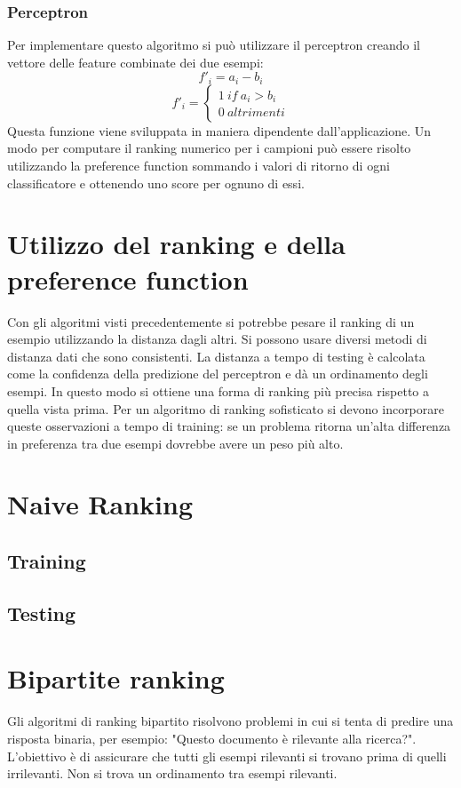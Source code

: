 		\subsubsection{Perceptron}
		Per implementare questo algoritmo si pu\`o utilizzare il perceptron creando il vettore delle feature combinate dei due esempi:
		$$f'_i = a_i -b_i$$
		$$f'_i = \begin{cases}1\ if\ a_i > b_i\\0\ altrimenti\end{cases}$$
		Questa funzione viene sviluppata in maniera dipendente dall'applicazione.
		Un modo per computare il ranking numerico per i campioni pu\`o essere risolto utilizzando la preference function sommando i valori di ritorno di ogni classificatore e ottenendo uno score per ognuno di essi.

\section{Utilizzo del ranking e della preference function}
Con gli algoritmi visti precedentemente si potrebbe pesare il ranking di un esempio utilizzando la distanza dagli altri.
Si possono usare diversi metodi di distanza dati che sono consistenti.
La distanza a tempo di testing \`e calcolata come la confidenza della predizione del perceptron e d\`a un ordinamento degli esempi.
In questo modo si ottiene una forma di ranking pi\`u precisa rispetto a quella vista prima.
Per un algoritmo di ranking sofisticato si devono incorporare queste osservazioni a tempo di training: se un problema ritorna un'alta differenza in preferenza tra due esempi dovrebbe avere un peso pi\`u alto.

\section{Naive Ranking}

	\subsection{Training}
	
	
	\subsection{Testing}
	

\section{Bipartite ranking}
Gli algoritmi di ranking bipartito risolvono problemi in cui si tenta di predire una risposta binaria, per esempio: "Questo documento \`e rilevante alla ricerca?".
L'obiettivo \`e di assicurare che tutti gli esempi rilevanti si trovano prima di quelli irrilevanti.
Non si trova un ordinamento tra esempi rilevanti.


